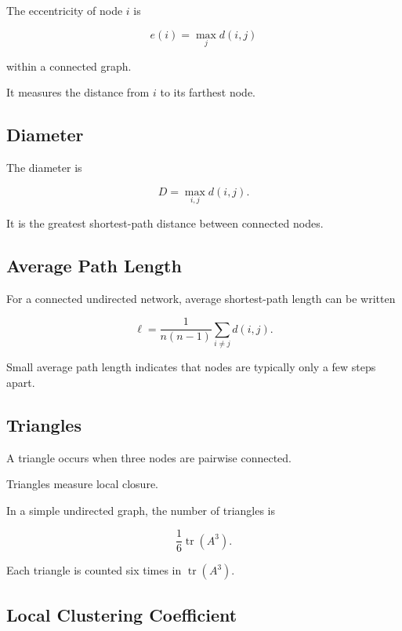 The eccentricity of node \(i\) is

\[
\boxed{
e(i)
=
\max_jd(i,j)
}
\]

within a connected graph.

It measures the distance from \(i\) to its farthest node.

\subsection{Diameter}
\label{subsec:network-diameter}

The diameter is

\[
\boxed{
D
=
\max_{i,j}
d(i,j).
}
\]

It is the greatest shortest-path distance between connected nodes.

\subsection{Average Path Length}
\label{subsec:average-path-length}

For a connected undirected network, average shortest-path length can be
written

\[
\boxed{
\ell
=
\frac{1}{n(n-1)}
\sum_{i\neq j}
d(i,j).
}
\]

Small average path length indicates that nodes are typically only a few steps
apart.

\subsection{Triangles}
\label{subsec:network-triangles}

A triangle occurs when three nodes are pairwise connected.

Triangles measure local closure.

In a simple undirected graph, the number of triangles is

\[
\boxed{
\frac{1}{6}
\operatorname{tr}(A^3).
}
\]

Each triangle is counted six times in \(\operatorname{tr}(A^3)\).

\subsection{Local Clustering Coefficient}
\label{subsec:local-clustering}

